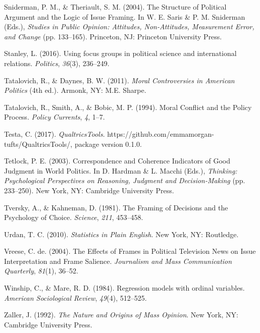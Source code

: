 \documentclass[12pt,econ]{sources/authesis}
\begin{document}
\leavevmode\hypertarget{ref-sniderman_structure_2004}{}%
Sniderman, P. M., \& Theriault, S. M. (2004). The Structure of Political Argument and the Logic of Issue Framing. In W. E. Saris \& P. M. Sniderman (Eds.), \emph{Studies in Public Opinion: Attitudes, Non-Attitudes, Measurement Error, and Change} (pp. 133--165). Princeton, NJ: Princeton University Press.

\leavevmode\hypertarget{ref-stanley_2016_using}{}%
Stanley, L. (2016). Using focus groups in political science and international relations. \emph{Politics}, \emph{36}(3), 236--249.

\leavevmode\hypertarget{ref-tatalovich_moral_2011}{}%
Tatalovich, R., \& Daynes, B. W. (2011). \emph{Moral Controversies in American Politics} (4th ed.). Armonk, NY: M.E. Sharpe.

\leavevmode\hypertarget{ref-tatalovich_moral_1994}{}%
Tatalovich, R., Smith, A., \& Bobic, M. P. (1994). Moral Conflict and the Policy Process. \emph{Policy Currents}, \emph{4}, 1--7.

\leavevmode\hypertarget{ref-testa_2017_qualtricstools}{}%
Testa, C. (2017). \emph{QualtricsTools}. https://github.com/emmamorgan-tufts/QualtricsTools/, package version 0.1.0.

\leavevmode\hypertarget{ref-tetlock_correspondence_2003}{}%
Tetlock, P. E. (2003). Correspondence and Coherence Indicators of Good Judgment in World Politics. In D. Hardman \& L. Macchi (Eds.), \emph{Thinking: Psychological Perspectives on Reasoning, Judgment and Decision-Making} (pp. 233--250). New York, NY: Cambridge University Press.

\leavevmode\hypertarget{ref-tversky_framing_1981}{}%
Tversky, A., \& Kahneman, D. (1981). The Framing of Decisions and the Psychology of Choice. \emph{Science}, \emph{211}, 453--458.

\leavevmode\hypertarget{ref-urdan_statistics_2010}{}%
Urdan, T. C. (2010). \emph{Statistics in Plain English}. New York, NY: Routledge.

\leavevmode\hypertarget{ref-vreese_effects_2004}{}%
Vreese, C. de. (2004). The Effects of Frames in Political Television News on Issue Interpretation and Frame Salience. \emph{Journalism and Mass Communication Quarterly}, \emph{81}(1), 36--52.

\leavevmode\hypertarget{ref-winship_1984_regression}{}%
Winship, C., \& Mare, R. D. (1984). Regression models with ordinal variables. \emph{American Sociological Review}, \emph{49}(4), 512--525.

\leavevmode\hypertarget{ref-zaller_nature_1992}{}%
Zaller, J. (1992). \emph{The Nature and Origins of Mass Opinion}. New York, NY: Cambridge University Press.
\end{document}
